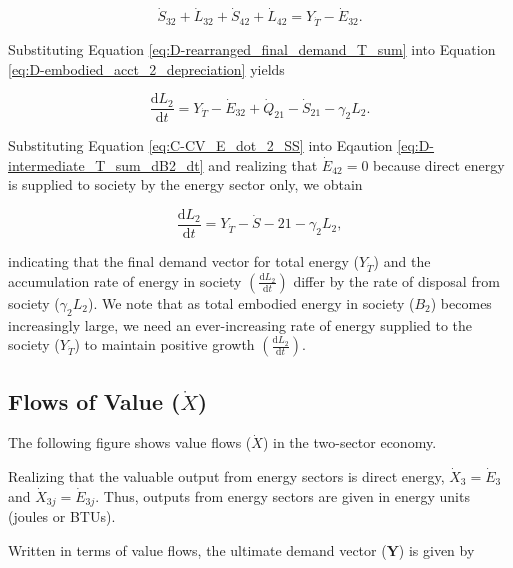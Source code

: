 \documentclass[authoryear,preprint,review,12pt]{elsarticle}
\renewcommand{\vec}[1]{\mathbf{#1}}
\begin{document}
\begin{equation} \label{eq:D-rearranged_final_demand_T_sum}
	\dot{S}_{32} +\dot{L}_{32} + \dot{S}_{42} + \dot{L}_{42} = Y_{\dot{T}} - \dot{E}_{32}.
\end{equation}

\noindent Substituting Equation \ref{eq:D-rearranged_final_demand_T_sum} into Equation \ref{eq:D-embodied_acct_2_depreciation} yields

\begin{equation} \label{eq:D-intermediate_T_sum_dB2_dt}
	\frac{\mathrm{d}L_2}{\mathrm{d}t} = Y_{\dot{T}} - \dot{E}_{32} + \dot{Q}_{21} - \dot{S}_{21} - \gamma_2 L_2.
\end{equation}

Substituting Equation \ref{eq:C-CV_E_dot_2_SS} into Eqaution \ref{eq:D-intermediate_T_sum_dB2_dt} and realizing that $\dot{E}_{42} = 0$ because direct energy is supplied to society by the energy sector only, we obtain 

\begin{equation} \label{eq:D-compare_demand_and_accumulation}
	\frac{\mathrm{d}L_{2}}{\mathrm{d}t} = Y_{\dot{T}} - \dot{S}-{21} - \gamma_{2}L_{2},
\end{equation}

\noindent indicating that the final demand vector for total energy ($Y_{\dot{T}}$) and the accumulation rate of energy in society $\left(\frac{\mathrm{d}L_{2}}{\mathrm{d}t}\right)$ differ by the rate of disposal from society ($\gamma_{2}L_{2}$). We note that as total embodied energy in society ($B_{2}$) becomes increasingly large, we need an ever-increasing rate of energy supplied to the society ($Y_{\dot{T}}$) to maintain positive growth $\left(\frac{\mathrm{d}L_{2}}{\mathrm{d}t}\right)$. 

\subsection{Flows of Value ($\dot{X}$)}

The following figure shows value flows ($\dot{X}$) in the two-sector economy.

Realizing that the valuable output from energy sectors is direct energy, $\dot{X}_{3} = \dot{E}_{3}$ and $\dot{X}_{3j} = \dot{E}_{3j}$. Thus, outputs from energy sectors are given in energy units (joules or BTUs). 

Written in terms of value flows, the ultimate demand vector ($\vec{Y}$) is given by
\end{document}
